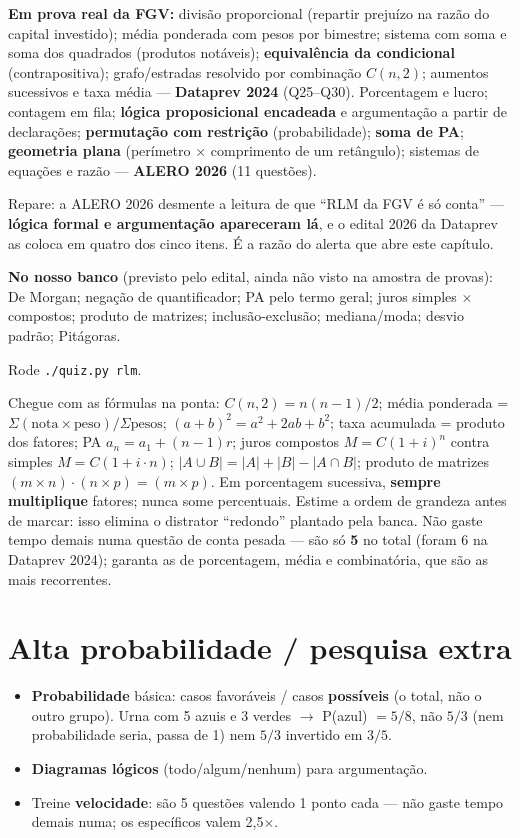 \begin{jacaiu}
\textbf{Em prova real da FGV:} divisão proporcional (repartir prejuízo na
razão do capital investido); média ponderada com pesos por bimestre; sistema
com soma e soma dos quadrados (produtos notáveis); \textbf{equivalência da
condicional} (contrapositiva); grafo/estradas resolvido por combinação
$C(n,2)$; aumentos sucessivos e taxa média --- \textbf{Dataprev 2024}
(Q25--Q30). Porcentagem e lucro; contagem em fila; \textbf{lógica
proposicional encadeada} e argumentação a partir de declarações;
\textbf{permutação com restrição} (probabilidade); \textbf{soma de PA};
\textbf{geometria plana} (perímetro $\times$ comprimento de um retângulo);
sistemas de equações e razão --- \textbf{ALERO 2026} (11 questões).

Repare: a ALERO 2026 desmente a leitura de que ``RLM da FGV é só conta'' ---
\textbf{lógica formal e argumentação apareceram lá}, e o edital 2026 da
Dataprev as coloca em quatro dos cinco itens. É a razão do alerta que abre
este capítulo.

\textbf{No nosso banco} (previsto pelo edital, ainda não visto na amostra de
provas): De Morgan; negação de quantificador; PA pelo termo geral; juros
simples $\times$ compostos; produto de matrizes; inclusão-exclusão;
mediana/moda; desvio padrão; Pitágoras.

Rode \texttt{./quiz.py rlm}.
\end{jacaiu}

\begin{comosair}
Chegue com as fórmulas na ponta: $C(n,2)=n(n-1)/2$; média ponderada =
$\Sigma(\text{nota}\times\text{peso})/\Sigma\text{pesos}$;
$(a+b)^2=a^2+2ab+b^2$; taxa acumulada = produto dos fatores; PA
$a_n=a_1+(n-1)r$; juros compostos $M=C(1+i)^n$ contra simples
$M=C(1+i{\cdot}n)$; $|A\cup B|=|A|+|B|-|A\cap B|$; produto de matrizes
$(m{\times}n)\cdot(n{\times}p)=(m{\times}p)$. Em porcentagem
sucessiva, \textbf{sempre multiplique} fatores; nunca some percentuais.
Estime a ordem de grandeza antes de marcar: isso elimina o distrator
``redondo'' plantado pela banca. Não gaste tempo demais numa questão de
conta pesada --- são só \textbf{5} no total (foram 6 na Dataprev 2024);
garanta as de porcentagem, média e combinatória, que são as mais
recorrentes.
\end{comosair}

\section{Alta probabilidade / pesquisa extra}

\begin{itemize}
\item \textbf{Probabilidade} básica: casos favoráveis / casos
\textbf{possíveis} (o total, não o outro grupo). Urna com 5 azuis e 3 verdes
$\to$ P(azul) $= 5/8$, não $5/3$ (nem probabilidade seria, passa de 1) nem
$5/3$ invertido em $3/5$.
\item \textbf{Diagramas lógicos} (todo/algum/nenhum) para argumentação.
\item Treine \textbf{velocidade}: são 5 questões valendo 1 ponto cada ---
não gaste tempo demais numa; os específicos valem 2,5$\times$.
\end{itemize}

